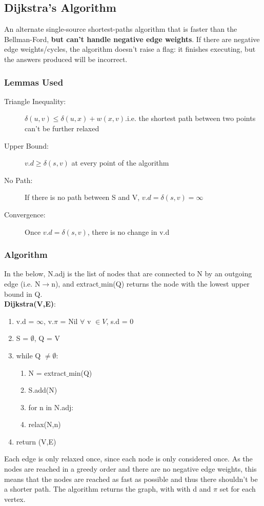 \subsection{Dijkstra's Algorithm}
An alternate single-source shortest-paths algorithm that is faster than the Bellman-Ford, \textbf{but can't handle negative edge weights}. If there are negative edge weights/cycles, the algorithm doesn't raise a flag: it finishes executing, but the answers produced will be incorrect. 

\subsubsection{Lemmas Used}
\begin{description}
    \item [Triangle Inequality:] \(\delta(u,v) \leq \delta(u,x) + w(x,v)\).i.e. the shortest path between two points can't be further relaxed
    \item [Upper Bound:] \(v.d \geq \delta (s,v) \) at every point of the algorithm
    \item [No Path:] If there is no path between S and V, $v.d=\delta(s,v)=\infty$
    \item [Convergence:] Once \(v.d = \delta (s,v)\), there is no change in v.d
\end{description}

\subsubsection{Algorithm}
In the below, N.adj is the list of nodes that are connected to N by an outgoing edge (i.e. N$\rightarrow$n), and extract$\_$min(Q) returns the node with the lowest upper bound in Q.\\
\textbf{Dijkstra(V,E)}:
\begin{enumerate}[label=\Alph*]
    \item v.d = $\infty$, v.$\pi$ = Nil $\forall$ v $\in V$, s.d = 0
    \item S = $\emptyset$, Q = V 
    \item while Q $\neq\emptyset $: 
\begin{enumerate}[label=\arabic*]
    \item N = extract$\_$min(Q)
    \item S.add(N)
    \item for n in N.adj:
    \item [] \quad relax(N,n)
\end{enumerate}  
\item return (V,E)
\end{enumerate}
Each edge is only relaxed once, since each node is only considered once. As the nodes are reached in a greedy order and there are no negative edge weights, this means that the nodes are reached as fast as possible and thus there shouldn't be a shorter path. The algorithm returns the graph, with with d and $\pi$ set for each vertex.

